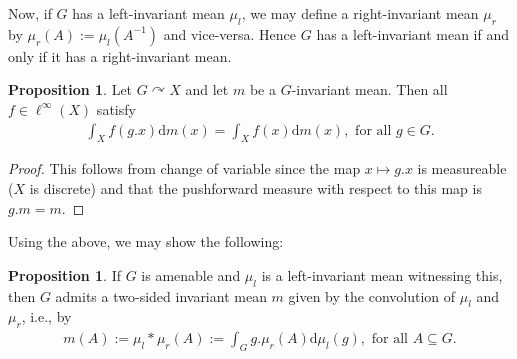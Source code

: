 \documentclass[10pt,oneside,openany,final]{memoir}
\theoremstyle{definition}
\newtheorem{proposition}[theorem]{Proposition}
\theoremstyle{Break}
\renewcommand{\d}{\mathrm{d}}
\renewcommand{\Re}{\mathrm{Re}}
\renewcommand{\Im}{\mathrm{Im}}
\def\acts{\curvearrowright}
\begin{document}
Now, if $G$ has a left-invariant mean $\mu_{l}$, we may define a right-invariant mean $\mu_r$ by $\mu_r(A):=\mu_l(A^{-1})$ and vice-versa. Hence $G$ has a left-invariant mean if and only if it has a right-invariant mean.
\begin{proposition}
	Let $G \acts X$ and let $m$ be a $G$-invariant mean. Then all $f \in \ell^\infty(X)$ satisfy
	\begin{align*}
		\int_{X}f(g.x) \d m(x)= \int_{X}f(x) \d m(x), \text{ for all } g \in G.
	\end{align*}
\begin{proof}
This follows from change of variable since the map $x \mapsto g.x$ is measureable ($X$ is discrete) and that the pushforward measure with respect to this map is $g.m=m$.
\end{proof}
\end{proposition}
Using the above, we may show the following:
\begin{proposition}
	If $G$ is amenable and $\mu_l$ is a left-invariant mean witnessing this, then $G$ admits a two-sided invariant mean $m$ given by the convolution of $\mu_l$ and $\mu_r$, i.e., by
	\begin{align*}
		m(A):=\mu_l \ast \mu_r(A):=\int_G g.\mu_r(A) \d \mu_l(g), \text{ for all } A \subseteq G.
	\end{align*}

\end{proposition}
\end{document}
